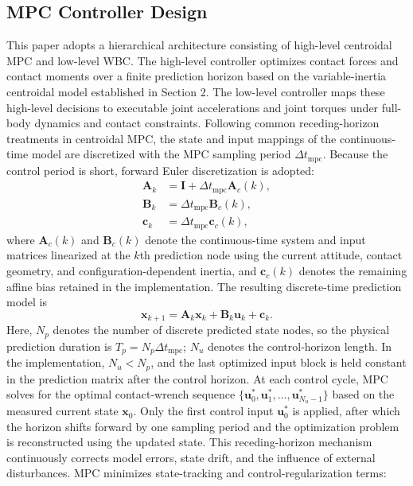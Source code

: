 \documentclass[5p,times]{elsarticle}
\begin{document}
\subsection{MPC Controller Design}
This paper adopts a hierarchical architecture consisting of high-level centroidal MPC and low-level WBC. The high-level controller optimizes contact forces and contact moments over a finite prediction horizon based on the variable-inertia centroidal model established in Section 2. The low-level controller maps these high-level decisions to executable joint accelerations and joint torques under full-body dynamics and contact constraints. Following common receding-horizon treatments in centroidal MPC, the state and input mappings of the continuous-time model are discretized with the MPC sampling period $\Delta t_{\mathrm{mpc}}$. Because the control period is short, forward Euler discretization is adopted:
\begin{equation}
\begin{aligned}
\bm A_k&=\bm I+\Delta t_{\mathrm{mpc}}\bm A_c(k),\\
\bm B_k&=\Delta t_{\mathrm{mpc}}\bm B_c(k),\\
\bm c_k&=\Delta t_{\mathrm{mpc}}\bm c_c(k),
\end{aligned}
\label{eq:euler_disc}
\end{equation}
where $\bm A_c(k)$ and $\bm B_c(k)$ denote the continuous-time system and input matrices linearized at the $k$th prediction node using the current attitude, contact geometry, and configuration-dependent inertia, and $\bm c_c(k)$ denotes the remaining affine bias retained in the implementation. The resulting discrete-time prediction model is
\begin{equation}
\bm x_{k+1}=\bm A_k\bm x_k+\bm B_k\bm u_k+\bm c_k.
\label{eq:disc}
\end{equation}
Here, $N_p$ denotes the number of discrete predicted state nodes, so the physical prediction duration is $T_p=N_p\Delta t_{\mathrm{mpc}}$; $N_u$ denotes the control-horizon length. In the implementation, $N_u<N_p$, and the last optimized input block is held constant in the prediction matrix after the control horizon. At each control cycle, MPC solves for the optimal contact-wrench sequence $\{\bm u_0^\ast,\bm u_1^\ast,\ldots,\bm u_{N_u-1}^\ast\}$ based on the measured current state $\bm x_0$. Only the first control input $\bm u_0^\ast$ is applied, after which the horizon shifts forward by one sampling period and the optimization problem is reconstructed using the updated state. This receding-horizon mechanism continuously corrects model errors, state drift, and the influence of external disturbances. MPC minimizes state-tracking and control-regularization terms:
\end{document}

